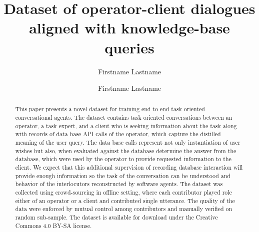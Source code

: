 \documentclass[runningheads,a4paper]{llncs}
\begin{document}


\title{Dataset of operator-client dialogues aligned with knowledge-base queries}


%
\iftrue %
\author{Firstname Lastname \and Firstname Lastname }

\fi
			
\maketitle

\begin{abstract}
    This paper presents a novel dataset for training end-to-end task oriented conversational agents.
    The dataset contains task oriented conversations between an operator, a task expert, and a client who is seeking information about the task along with records of data base API calls of the operator, which capture the distilled meaning of the user query.
    The data base calls represent not only instantiation of user wishes but also, when evaluated against the database determine the answer from the database, which were used by the operator to provide requested information to the client. 
    We expect that this additional supervision of recording database interaction will provide enough information so the task of the conversation can be understood and behavior of the interlocutors reconstructed by software agents.
    The dataset was collected using crowd-sourcing in offline setting, where each contributor played role either of an operator or a client and contributed single utterance.
    The quality of the data were enforced by mutual control among contributors and manually verified on random sub-sample.
    The dataset is available for download under the Creative Commons 4.0 BY-SA license.
\end{abstract}
\end{document}
